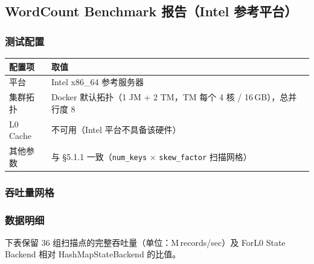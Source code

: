 \documentclass[a4paper,11pt]{article}
\newcommand{\project}{ForL0 State Backend}
\begin{document}
\subsection{WordCount Benchmark 报告（Intel 参考平台）}

\subsubsection{测试配置}

\begin{table}[H]
\centering
\small
\begin{tabularx}{\textwidth}{L{3.4cm} X}
\toprule
\textbf{配置项} & \textbf{取值} \\
\midrule
平台         & Intel x86\_64 参考服务器 \\
集群拓扑     & Docker 默认拓扑（1 JM + 2 TM，TM 每个 4 核 / 16\,GB），总并行度 8 \\
L0 Cache    & 不可用（Intel 平台不具备该硬件） \\
其他参数     & 与 \S5.1.1 一致（\texttt{num\_keys} $\times$ \texttt{skew\_factor} 扫描网格） \\
\bottomrule
\end{tabularx}
\end{table}

\subsubsection{吞吐量网格}


\FloatBarrier

\subsubsection{数据明细}

下表保留 36 组扫描点的完整吞吐量（单位：M\,records/sec）及 \project{} 相对 HashMapStateBackend 的比值。
\end{document}
